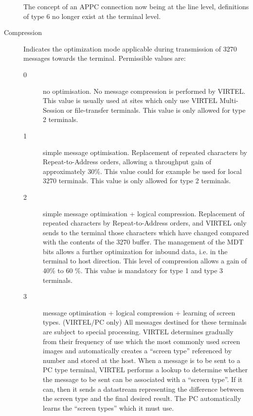 \documentclass[letterpaper,10pt,english]{sphinxmanual}
\begin{document}
\begin{description}
\begin{description}
\end{description}

The concept of an APPC connection now being at the line level, definitions of type 6 no longer exist at the terminal
level.

\item[{Compression}] \leavevmode
Indicates the optimization mode applicable during transmission of 3270 messages towards the terminal. Permissible values are:
\begin{description}
\item[{0}] \leavevmode
no optimisation.
No message compression is performed by VIRTEL. This value is usually used at sites which only use VIRTEL Multi-Session or file-transfer terminals. This value is only allowed for type 2 terminals.

\item[{1}] \leavevmode
simple message optimisation.
Replacement of repeated characters by Repeat-to-Address orders, allowing a throughput gain of approximately 30\%. This value could for example be used for local 3270 terminals.
This value is only allowed for type 2 terminals.

\item[{2}] \leavevmode
simple message optimisation + logical compression.
Replacement of repeated characters by Repeat-to-Address orders, and VIRTEL only sends to the terminal those characters which have changed compared with the contents of the 3270 buffer. The management of the MDT bits allows a further
optimization for inbound data, i.e. in the terminal to host direction. This level of compression allows a gain of 40\% to 60 \%. This value is mandatory for type 1 and type 3 terminals.

\item[{3}] \leavevmode
message optimisation + logical compression + learning of screen types. (VIRTEL/PC only)
All messages destined for these terminals are subject to special processing. VIRTEL determines gradually from their frequency of use which the most commonly used screen images and automatically creates a “screen type” referenced by number and stored at the host. When a message is to be sent to a PC type terminal, VIRTEL performs a lookup to determine whether the message to be sent can be associated with a “screen type”. If it can, then it sends a datastream representing the difference between the screen type and the final desired result. The PC automatically learns the “screen types” which it must use.

\end{description}


\end{description}
\end{document}
